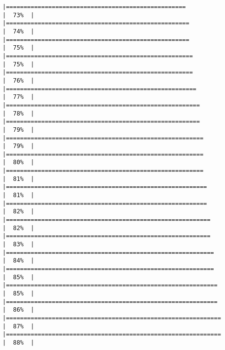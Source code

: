 \documentclass[
]{article}
\begin{document}
\begin{verbatim}
|===================================================                   |  73%  |                                                                              |====================================================                  |  74%  |                                                                              |====================================================                  |  75%  |                                                                              |=====================================================                 |  75%  |                                                                              |=====================================================                 |  76%  |                                                                              |======================================================                |  77%  |                                                                              |=======================================================               |  78%  |                                                                              |=======================================================               |  79%  |                                                                              |========================================================              |  79%  |                                                                              |========================================================              |  80%  |                                                                              |========================================================              |  81%  |                                                                              |=========================================================             |  81%  |                                                                              |=========================================================             |  82%  |                                                                              |==========================================================            |  82%  |                                                                              |==========================================================            |  83%  |                                                                              |===========================================================           |  84%  |                                                                              |===========================================================           |  85%  |                                                                              |============================================================          |  85%  |                                                                              |============================================================          |  86%  |                                                                              |=============================================================         |  87%  |                                                                              |=============================================================         |  88%  |                                                                              
\end{verbatim}
\end{document}
